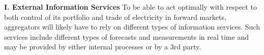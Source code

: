 \textbf{I. External Information Services}
To be able to act optimally with respect to both control of its portfolio and trade of electricity in forward markets, aggregators will likely have to rely on different types of information services. Such services include different types of forecasts and measurements in real time and may be provided by either internal processes or by a 3rd party. 

